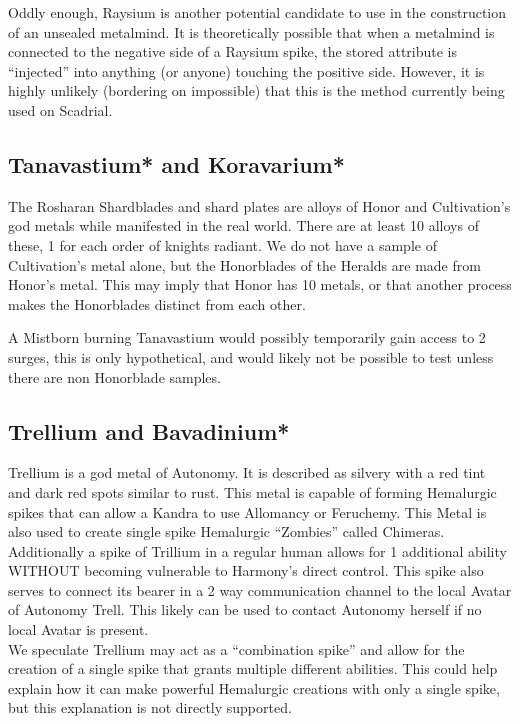 \documentclass[conference]{IEEEtran}
\newcommand{\n}{\hfill\break}
\begin{document}
Oddly enough, Raysium is another potential candidate to use in the construction of an unsealed metalmind.  It is theoretically possible that when a metalmind is connected to the negative side of a Raysium spike, the stored attribute is ``injected'' into anything (or anyone) touching the positive side.  However, it is highly unlikely (bordering on impossible) that this is the method currently being used on Scadrial.  
\subsection*{\textbf{Tanavastium}*\cite{honor-name} \textbf{and} \textbf{Koravarium}*\cite{cultiv-name}}
The Rosharan Shardblades and shard plates are alloys of Honor and Cultivation's god metals while manifested in the real world.  There are at least 10 alloys of these, 1 for each order of knights radiant.\cite{shard-alloy}  We do not have a sample of Cultivation's metal alone, but the Honorblades of the Heralds are made from Honor's metal.\cite{honorblade}  This may imply that Honor has 10 metals, or that another process makes the Honorblades distinct from each other.

A Mistborn burning Tanavastium would possibly temporarily gain access to 2 surges, this is only hypothetical, and would likely not be possible to test unless there are non Honorblade samples.
\n\n\n
\subsection*{\textbf{Trellium}\cite{trellium} \textbf{and Bavadinium}*}
Trellium is a god metal of Autonomy.\cite{TLM-CH18}  It is described as silvery with a red tint and dark red spots similar to rust.\cite{SoS-EP}  This metal is capable of forming Hemalurgic spikes that can allow a Kandra to use Allomancy or Feruchemy.\cite{SoS-CH7}  This Metal is also used to create single spike Hemalurgic ``Zombies'' called Chimeras.\cite{SoS-CH21}  Additionally a spike of Trillium in a regular human allows for 1 additional ability WITHOUT becoming vulnerable to Harmony's direct control.\cite{TLM-CH4}\cite{TLM-CH65}  This spike also serves to connect its bearer in a 2 way communication channel to the local Avatar of Autonomy Trell.\cite{TLM-CH19} This likely can be used to contact Autonomy herself if no local Avatar is present.\\

We speculate Trellium may act as a ``combination spike'' and allow for the creation of a single spike that grants multiple different abilities.  This could help explain how it can make powerful Hemalurgic creations with only a single spike, but this explanation is not directly supported.\\
 
\end{document}
